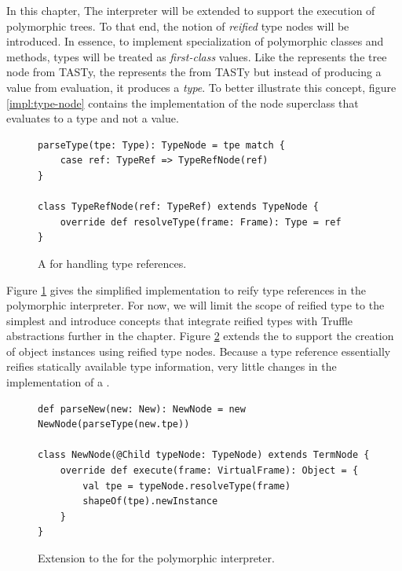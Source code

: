 In this chapter, The interpreter will be extended to support the execution of polymorphic trees.
To that end, the notion of \textit{reified} type nodes will be introduced.
In essence, to implement specialization of polymorphic classes and methods, types will be treated as \textit{first-class} values.
Like the  represents the  tree node from TASTy, the  represents the  from TASTy but instead of producing a value from evaluation, it produces a \textit{type}.
To better illustrate this concept, figure \ref{impl:type-node} contains the implementation of the node superclass that evaluates to a type and not a value.

\begin{figure}[!htb]
\begin{verbatim}
parseType(tpe: Type): TypeNode = tpe match {
	case ref: TypeRef => TypeRefNode(ref)
}

class TypeRefNode(ref: TypeRef) extends TypeNode {
	override def resolveType(frame: Frame): Type = ref
}
\end{verbatim}
\caption{A  for handling type references.}
\label{impl:parse-type}
\end{figure}

Figure \ref{impl:parse-type} gives the simplified implementation to reify type references in the polymorphic interpreter.
For now, we will limit the scope of reified type to the simplest and introduce concepts that integrate reified types with Truffle abstractions further in the chapter.
Figure \ref{impl:extend-new} extends the  to support the creation of object instances using reified type nodes.
Because a type reference essentially reifies statically available type information, very little changes in the implementation of a .

\begin{figure}[!htb]
\begin{verbatim}
def parseNew(new: New): NewNode = new NewNode(parseType(new.tpe))	

class NewNode(@Child typeNode: TypeNode) extends TermNode {
	override def execute(frame: VirtualFrame): Object = {
		val tpe = typeNode.resolveType(frame)
		shapeOf(tpe).newInstance
	}
}
\end{verbatim}
\caption{Extension to the  for the polymorphic interpreter.}
\label{impl:extend-new}
\end{figure}

